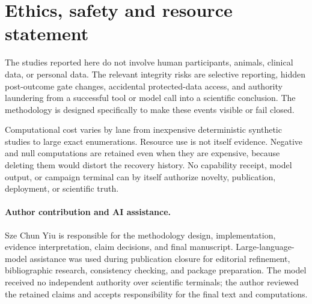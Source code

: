 \section{Ethics, safety and resource statement}

The studies reported here do not involve human participants, animals, clinical data, or personal data. The relevant integrity risks are selective reporting, hidden post-outcome gate changes, accidental protected-data access, and authority laundering from a successful tool or model call into a scientific conclusion. The methodology is designed specifically to make these events visible or fail closed.

Computational cost varies by lane from inexpensive deterministic synthetic studies to large exact enumerations. Resource use is not itself evidence. Negative and null computations are retained even when they are expensive, because deleting them would distort the recovery history. No capability receipt, model output, or campaign terminal can by itself authorize novelty, publication, deployment, or scientific truth.

\paragraph{Author contribution and AI assistance.}
Sze Chun Yiu is responsible for the methodology design, implementation, evidence interpretation, claim decisions, and final manuscript. Large-language-model assistance was used during publication closure for editorial refinement, bibliographic research, consistency checking, and package preparation. The model received no independent authority over scientific terminals; the author reviewed the retained claims and accepts responsibility for the final text and computations.